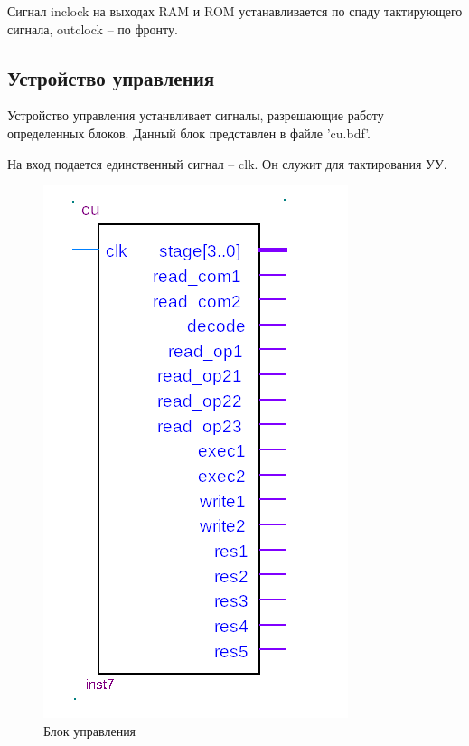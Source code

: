 Сигнал inclock на выходах RAM и ROM устанавливается по спаду тактирующего сигнала, outclock -- по фронту.

\subsection{Устройство управления}
Устройство управления устанвливает сигналы, разрешающие работу определенных блоков.
Данный блок представлен в файле 'cu.bdf'.

На вход подается единственный сигнал -- clk. Он служит для тактирования УУ.

\begin{figure}[ht]{\textwidth}
\centering
    \includegraphics[scale=0.8]{cub}
    \caption{Блок управления}
\end{figure}

